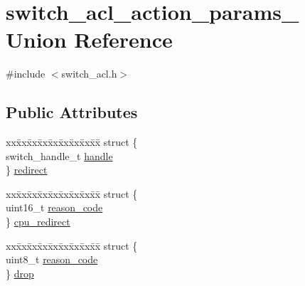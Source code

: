 \hypertarget{unionswitch__acl__action__params__}{\section{switch\+\_\+acl\+\_\+action\+\_\+params\+\_\+ Union Reference}
\label{unionswitch__acl__action__params__}
}


{\ttfamily \#include $<$switch\+\_\+acl.\+h$>$}

\subsection*{Public Attributes}
\begin{DoxyCompactItemize}
\item 
\begin{tabbing}
xx\=xx\=xx\=xx\=xx\=xx\=xx\=xx\=xx\=\kill
struct \{\\
\>switch\_handle\_t \hyperlink{unionswitch__acl__action__params___aff254c1d3699f3f12fef4677e41fe952}{handle}\\
\} \hyperlink{unionswitch__acl__action__params___adc73dc53f581c8d332224c64763d55b9}{redirect}\\

\end{tabbing}\item 
\begin{tabbing}
xx\=xx\=xx\=xx\=xx\=xx\=xx\=xx\=xx\=\kill
struct \{\\
\>uint16\_t \hyperlink{unionswitch__acl__action__params___a9746d0286a4eb88231f052f4cd82e6d7}{reason\_code}\\
\} \hyperlink{unionswitch__acl__action__params___a7177ef54f4154591f0e59cf51864d829}{cpu\_redirect}\\

\end{tabbing}\item 
\begin{tabbing}
xx\=xx\=xx\=xx\=xx\=xx\=xx\=xx\=xx\=\kill
struct \{\\
\>uint8\_t \hyperlink{unionswitch__acl__action__params___a1269fcd1fc7d6d7cf761499bd62954ff}{reason\_code}\\
\} \hyperlink{unionswitch__acl__action__params___a45e7416e8f297c7dccf551696e3ec288}{drop}\\

\end{tabbing}\end{DoxyCompactItemize}


